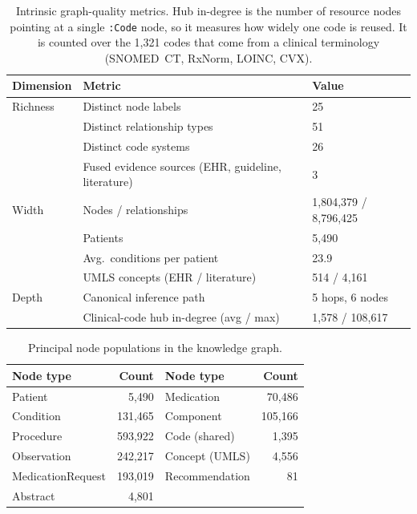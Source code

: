 \begin{table}[h]
\centering
\caption{Intrinsic graph-quality metrics. Hub in-degree is the number of resource
nodes pointing at a single \texttt{:Code} node, so it measures how widely one code is reused.
It is counted over the 1{,}321 codes that come from a clinical terminology (SNOMED~CT,
RxNorm, LOINC, CVX).}
\label{tab:graph-scale}
\begin{tabular}{@{}p{24mm}p{68mm}p{46mm}@{}}
\hline
\textbf{Dimension} & \textbf{Metric} & \textbf{Value} \\
\hline
Richness & Distinct node labels        & 25 \\
         & Distinct relationship types & 51 \\
         & Distinct code systems       & 26 \\
         & Fused evidence sources (EHR, guideline, literature) & 3 \\
Width    & Nodes / relationships       & 1{,}804{,}379 / 8{,}796{,}425 \\
         & Patients                    & 5{,}490 \\
         & Avg.\ conditions per patient & 23.9 \\
         & UMLS concepts (EHR / literature) & 514 / 4{,}161 \\
Depth    & Canonical inference path & 5 hops, 6 nodes \\
         & Clinical-code hub in-degree (avg / max) & 1{,}578 / 108{,}617 \\
\hline
\end{tabular}
\end{table}

\begin{table}[h]
\centering
\caption{Principal node populations in the knowledge graph.}
\label{tab:graph-counts}
\begin{tabular}{lr@{\hskip 2cm}lr}
\hline
\textbf{Node type} & \textbf{Count} & \textbf{Node type} & \textbf{Count} \\
\hline
Patient          & 5{,}490   & Medication      & 70{,}486  \\
Condition        & 131{,}465 & Component       & 105{,}166 \\
Procedure        & 593{,}922 & Code (shared)   & 1{,}395   \\
Observation      & 242{,}217 & Concept (UMLS)  & 4{,}556   \\
MedicationRequest& 193{,}019 & Recommendation  & 81        \\
Abstract         & 4{,}801   & & \\
\hline
\end{tabular}
\end{table}

